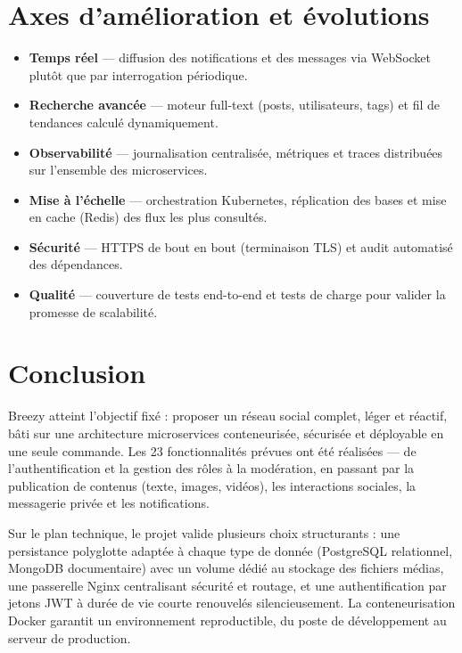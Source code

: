 \newpage

\section{Axes d'amélioration et évolutions}

\begin{itemize}[leftmargin=1.4em]
  \item \textbf{Temps réel} — diffusion des notifications et des messages via
        WebSocket plutôt que par interrogation périodique.
  \item \textbf{Recherche avancée} — moteur full-text (posts, utilisateurs, tags)
        et fil de tendances calculé dynamiquement.
  \item \textbf{Observabilité} — journalisation centralisée, métriques et traces
        distribuées sur l'ensemble des microservices.
  \item \textbf{Mise à l'échelle} — orchestration Kubernetes, réplication des bases
        et mise en cache (Redis) des flux les plus consultés.
  \item \textbf{Sécurité} — HTTPS de bout en bout (terminaison TLS) et audit
        automatisé des dépendances.
  \item \textbf{Qualité} — couverture de tests end-to-end et tests de charge pour
        valider la promesse de scalabilité.
\end{itemize}

\newpage

\section*{Conclusion}

Breezy atteint l'objectif fixé : proposer un réseau social complet, léger et
réactif, bâti sur une architecture microservices conteneurisée, sécurisée et
déployable en une seule commande. Les 23 fonctionnalités prévues ont été
réalisées — de l'authentification et la gestion des rôles à la modération, en
passant par la publication de contenus (texte, images, vidéos), les interactions
sociales, la messagerie privée et les notifications.

\noindent Sur le plan technique, le projet valide plusieurs choix structurants : une
persistance polyglotte adaptée à chaque type de donnée (PostgreSQL relationnel,
MongoDB documentaire) avec un volume dédié au stockage des fichiers médias, une
passerelle Nginx centralisant sécurité et routage, et une authentification par
jetons JWT à durée de vie courte renouvelés silencieusement. La conteneurisation
Docker garantit un environnement reproductible, du poste de développement au
serveur de production.


